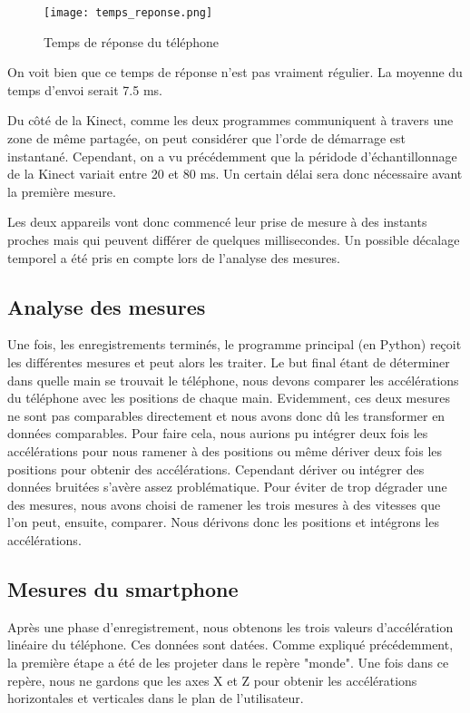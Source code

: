 \documentclass[12pt, french]{article}
\begin{document}
\begin{figure}[H]
\centering
\texttt{[image: temps\_reponse.png]}
\caption{Temps de réponse du téléphone}
\label{fig5}
\end{figure}


On voit bien que ce temps de réponse n'est pas vraiment régulier. La moyenne du temps d'envoi serait 7.5 ms.


Du côté de la Kinect, comme les deux programmes communiquent à travers une zone de même partagée, on peut considérer que l'orde de démarrage est instantané. Cependant, on a vu précédemment que la péridode d'échantillonnage de la Kinect variait entre 20 et 80 ms. Un certain délai sera donc nécessaire avant la première mesure.

Les deux appareils vont donc commencé leur prise de mesure à des instants proches mais qui peuvent différer de quelques millisecondes. Un possible décalage temporel a été pris en compte lors de l'analyse des mesures.


\subsection{Analyse des mesures}

Une fois, les enregistrements terminés, le programme principal (en Python) reçoit les différentes mesures et peut alors les traiter. Le but final étant de déterminer dans quelle main se trouvait le téléphone, nous devons comparer les accélérations du téléphone avec les positions de chaque main. Evidemment, ces deux mesures ne sont pas comparables directement et nous avons donc dû les transformer en données comparables. Pour faire cela, nous aurions pu intégrer deux fois les accélérations pour nous ramener à des positions ou même dériver deux fois les positions pour obtenir des accélérations. Cependant dériver ou intégrer des données bruitées s'avère assez problématique. Pour éviter de trop dégrader une des mesures, nous avons choisi de ramener les trois mesures à des vitesses que l'on peut, ensuite, comparer. Nous dérivons donc les positions et intégrons les accélérations.

\subsection{Mesures du smartphone}

Après une phase d'enregistrement, nous obtenons les trois valeurs d'accélération linéaire du téléphone. Ces données sont datées. Comme expliqué précédemment, la première étape a été de les projeter dans le repère "monde". Une fois dans ce repère, nous ne gardons que les axes X et Z pour obtenir les accélérations horizontales et verticales dans le plan de l'utilisateur.
\end{document}
